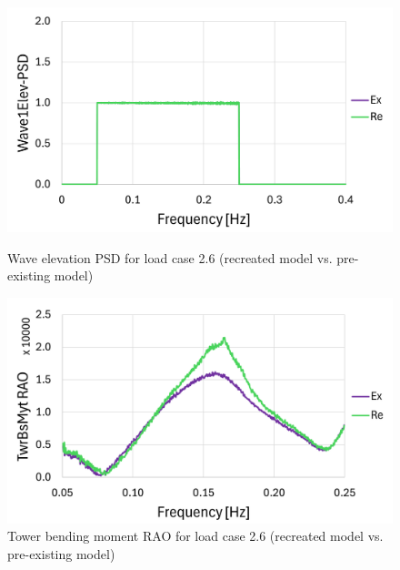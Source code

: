 \documentclass[a4paper, 11pt]{article}
\begin{document}
\begin{figure}[H]
    \begin{minipage}{0.48\textwidth}
        \centering
        \includegraphics[width=1\textwidth]{2.6_wave_mine_1.png}
        \caption{\small Wave elevation PSD for load case 2.6 (recreated model vs. pre-existing model)} 
        \label{fig:2.6_wave_mine_recreated}
    \end{minipage}
    \hfill
    \begin{minipage}{0.49\textwidth}
        \centering
        \vspace{-0.3cm}
        \includegraphics[width=1\textwidth]{2.6_twr_mine_1.png}
        \caption{\small Tower bending moment RAO for load case 2.6 (recreated model vs. pre-existing model)}
        \label{fig:2.6_twr_mine_recreated}
    \end{minipage}
\end{figure}
\end{document}
